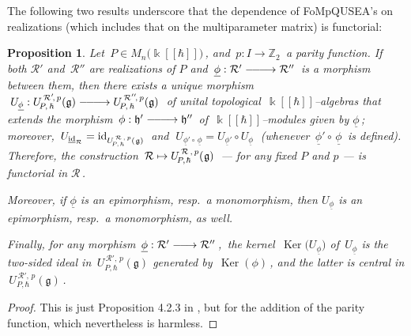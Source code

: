 \documentclass[12pt,reqno,twoside,a4paper]{amsart}
\numberwithin{equation}{section}
\newtheorem{prop}[lema]{Proposition}
\theoremstyle{definition}
\newtheorem{free text}[lema]{}
\theoremstyle{remark}
\newcommand \id{\operatorname{id}}
\newcommand \Ker{\operatorname{Ker}}
\newcommand{\R}{{\mathcal R}}
\def \ZZ {\mathbb{Z}}
\def \kh{{\Bbbk[[\hbar]]}}
\def \lieg{\mathfrak{g}}
\def \lieh{\mathfrak{h}}
\def \uRpPhg{U^{\,\R\,,\,p}_{\!P,\hskip0,7pt\hbar}(\hskip0,5pt\lieg)}
\def \pf{\begin{proof}}
\def \epf{\end{proof}}
\theoremstyle{plain}
\begin{document}
\vskip9pt

   The following two results underscore that the dependence of FoMpQUSEA's
   on realizations (which includes that on the multiparameter matrix) is functorial:

\vskip11pt

\begin{prop}  \label{prop: functor_R->uRPhg}
%
 Let  $ \, P \in M_{n}\big( \kh \big) \, $,  and
 $ \, p : I \longrightarrow \ZZ_2 \, $  a parity function.
 If both  $ \R' $  and  $ \, \R'' $  are realizations of  $ P $  and
 $ \, \underline{\phi} : \R' \relbar\joinrel\relbar\joinrel\longrightarrow \R'' \, $
 is a morphism between them,  then there exists a unique morphism
 $ \; U_{\underline{\phi}} : U^{\,\R'\!,\,p}_{\!P,\,\hbar}(\lieg) \relbar\joinrel\relbar\joinrel\longrightarrow U^{\,\R''\!,\,p}_{\!P,\,\hbar}(\lieg) \; $ of unital topological
 $ \, \kh $--algebras
 that extends the morphism  $ \, \phi : \lieh' \relbar\joinrel\relbar\joinrel\longrightarrow \lieh'' \, $
 of  $ \, \kh $--modules  given by
 $ \underline{\phi} \, $;  \,moreover,
 $ \, U_{\underline{\id}_\R} = \id_{\uRpPhg} \, $  and
 $ \; U_{\underline{\phi}' \circ\, \underline{\phi}} = U_{\underline{\phi}'} \circ U_{\underline{\phi}} \; $
 (whenever  $ \, \underline{\phi}' \circ\, \underline{\phi} \, $  is defined).
 Therefore, the construction  $ \, \R \mapsto \uRpPhg \, $
 --- for any fixed  $ P $  and  $ p $  ---   is functorial in  $ \R \, $.
                                                                              \par
   Moreover, if  $ \underline{\phi} $  is an epimorphism,
   resp.\ a monomorphism, then  $ U_{\underline{\phi}} $
   is an epimorphism, resp.\ a monomorphism, as well.
                                                                              \par
   Finally, for any morphism  $ \, \underline{\phi} : \R' \relbar\joinrel\longrightarrow \R'' \, $,
   \,the kernel  $ \, \Ker\big(U_{\underline{\phi}}\big) $
   of  $ \, U_{\underline{\phi}} $  is the two-sided ideal in
   $ \, U^{\,\R'\!,\,p}_{\!P,\hbar}(\lieg) $  generated by
   $ \, \Ker(\phi) \, $,  and the latter is central in  $ \, U^{\,\R'\!,\,p}_{\!P,\hbar}(\lieg) \, $.
%
\end{prop}

\pf
%
 This is just  Proposition 4.2.3 in \cite{GG3},  but for the
 addition of the parity function, which nevertheless is harmless.
%
\epf

\vskip7pt
\end{document}
